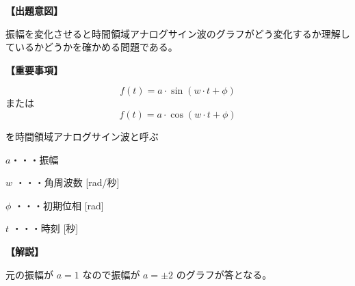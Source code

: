 \noindent \textbf{【出題意図】}

\noindent 振幅を変化させると時間領域アナログサイン波のグラフがどう変化するか理解しているかどうかを確かめる問題である。

\vspace{1em}
\noindent \textbf{【重要事項】}

\[
f(t) = a \cdot \sin( w \cdot t + \phi )
\]
%
\noindent または
%
\[
f(t) = a \cdot \cos( w \cdot t + \phi )
\]

\medskip
\noindent を時間領域アナログサイン波と呼ぶ

\bigskip
\noindent $a$・・・振幅

\bigskip
\noindent $w$ ・・・角周波数 [rad/秒]

\bigskip
\noindent $\phi$ ・・・初期位相 [rad]

\bigskip
\noindent $t$ ・・・時刻 [秒]

\vspace{1em}
\noindent \textbf{【解説】}

\noindent 元の振幅が $a=1$ なので振幅が $a=\pm 2$ のグラフが答となる。

